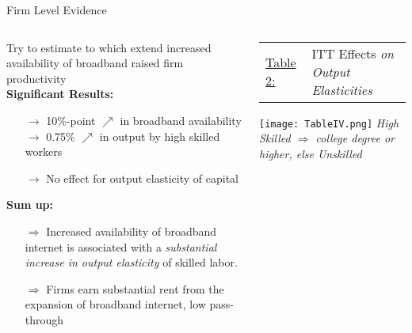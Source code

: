 \documentclass[compress, aspectratio=169, xcolor=dvipsnames]{beamer}
\begin{document}
\begin{frame}{Firm Level Evidence}

\begin{columns}
	
\begin{column}{0.55\textwidth}
Try to estimate to which extend increased availability of broadband raised firm productivity \\ 
\vspace{5pt}
\textbf{Significant Results:}
\begin{itemize}
	\item[$\rightarrow$] 10\%-point $\nearrow$ in broadband availability $\rightarrow$ 0.75\% $\nearrow$ in output by high skilled workers
	\item[$\rightarrow$] No effect for output elasticity of capital
\end{itemize}
\vspace{5pt}
\textbf{Sum up:}
\begin{itemize}
	\item[$\Rightarrow$] Increased availability of broadband internet is associated with a \textit{substantial increase in output elasticity} of skilled labor.
	\item[$\Rightarrow$] Firms earn substantial rent from the expansion of broadband internet, low pass-through
\end{itemize}


\end{column}

\begin{column}{0.45\textwidth}
	\centering
	\scriptsize{
	\begin{tabular}{l p{5cm}}
 	\underline{Table 2:} & ITT Effects \textit{on Output Elasticities}
 	\end{tabular}}
 	
    \texttt{[image: TableIV.png]}\qquad
    \tiny
    \textit{High Skilled $\Rightarrow$ college degree or higher, else Unskilled}
    
\end{column}
	
\end{columns}
	
\end{frame}
\end{document}
